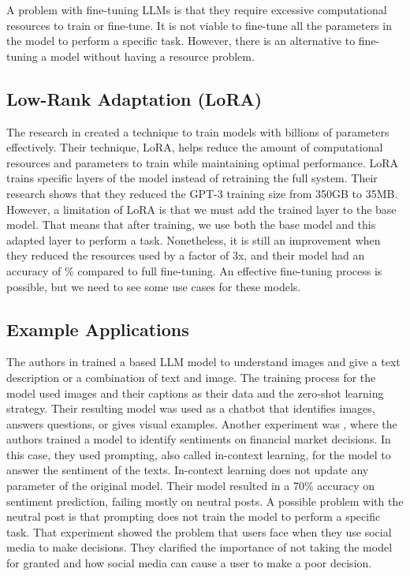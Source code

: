 A problem with fine-tuning LLMs is that they require excessive computational resources to train or fine-tune. It is not viable to fine-tune all the parameters in the model to perform a specific task. However, there is an alternative to fine-tuning a model without having a resource problem.


\subsection{Low-Rank Adaptation (LoRA)}
The research in \cite{hu2021loralowrankadaptationlarge} created a technique to train models with billions of parameters effectively. Their technique, LoRA, helps reduce the amount of computational resources and
parameters to train while maintaining optimal performance. LoRA trains specific layers of the model instead of retraining the full system. Their research shows that they reduced the GPT-3 training size from 350GB to
35MB. However, a limitation of LoRA is that we must add the trained layer to the base model. That means that after training, we use both the base model and this adapted layer to perform a task. Nonetheless, it is still an
improvement when they reduced the resources used by a factor of 3x, and their model had an accuracy of \% compared to full fine-tuning. An effective fine-tuning process is possible, but we need to see some use
cases for these models.

\subsection{Example Applications}
The authors in \cite{koh2023groundinglanguagemodelsimages} trained a based LLM model to understand images and give a text description or a combination of text and image. The training process for
the model used images and their captions as their data and the zero-shot learning strategy. Their resulting model was used as a chatbot that identifies images, answers questions, or gives
visual examples. Another experiment was \cite{inproceedings}, where the authors trained a model to identify sentiments on financial market decisions. In this case, they used prompting, also called in-context learning, for 
the model to answer the sentiment of the texts. In-context learning does not update any parameter of the original model. Their model resulted in a 70\% accuracy on sentiment prediction, failing mostly on neutral posts.
A possible problem with the neutral post is that prompting does not train the model to perform a specific task. That experiment showed the problem that users face when they use social media to make decisions.
They clarified the importance of not taking the model for granted and how social media can cause a user to make a poor decision.

